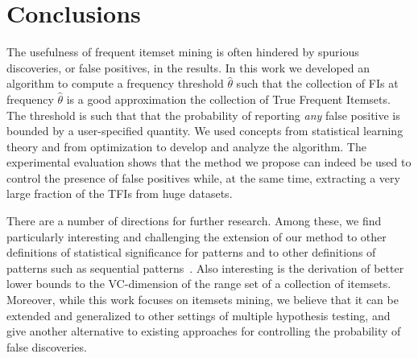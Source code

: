 \section{Conclusions}\label{sec:concl}
The usefulness of frequent itemset mining is often hindered by spurious
discoveries, or false positives, in the results. In this work we developed an
algorithm to compute a frequency threshold $\hat\theta$ such that the collection
of FIs at frequency $\hat\theta$ is a good approximation the collection of True
Frequent Itemsets. The threshold is such that that the probability of reporting
\emph{any} false positive is bounded by a user-specified quantity. We used
concepts from statistical learning theory and from optimization to develop and
analyze the algorithm. The experimental evaluation shows that the method we
propose can indeed be used to control the presence of false positives while, at
the same time, extracting a very large fraction of the TFIs from huge datasets.

There are a number of directions for further research. Among these, we find
particularly interesting and challenging the extension of our method to other
definitions of statistical significance for patterns and to other definitions of
patterns such as sequential patterns~\citep{LowCamRKP13}. Also interesting is
the derivation of better lower bounds to the VC-dimension of the range set of a
collection of itemsets. Moreover, while this work focuses on itemsets mining, we
believe that it can be extended and generalized to other settings of multiple
hypothesis testing, and give another alternative to existing approaches for
controlling the probability of false discoveries.
